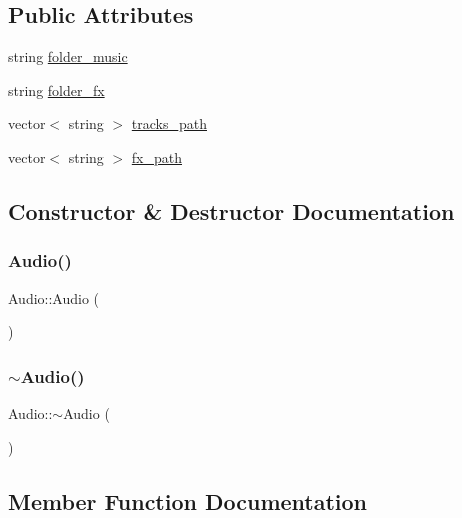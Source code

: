\subsection*{Public Attributes}
\begin{DoxyCompactItemize}
\item 
string \mbox{\hyperlink{class_audio_aeee37053acc6e828584929773ecc06db}{folder\+\_\+music}}
\item 
string \mbox{\hyperlink{class_audio_a2f33c4f728cb34b9d9225f24b7e12fed}{folder\+\_\+fx}}
\item 
vector$<$ string $>$ \mbox{\hyperlink{class_audio_ab3d160f5e442a0792424d4a506356a25}{tracks\+\_\+path}}
\item 
vector$<$ string $>$ \mbox{\hyperlink{class_audio_a159ec23ed30c61829850d4917bfb5ce7}{fx\+\_\+path}}
\end{DoxyCompactItemize}


\subsection{Constructor \& Destructor Documentation}
\mbox{\label{class_audio_aa9d3935a2b91ab4b825bc0cb05f245ea}} 
\subsubsection{\texorpdfstring{Audio()}{Audio()}}
{\footnotesize\ttfamily Audio\+::\+Audio (\begin{DoxyParamCaption}{ }\end{DoxyParamCaption})}

\mbox{\label{class_audio_ae8f54deecb5f48511aaab469e80294d6}} 
\subsubsection{\texorpdfstring{$\sim$Audio()}{~Audio()}}
{\footnotesize\ttfamily Audio\+::$\sim$\+Audio (\begin{DoxyParamCaption}{ }\end{DoxyParamCaption})\hspace{0.3cm}{\ttfamily [virtual]}}



\subsection{Member Function Documentation}
\mbox{\label{class_audio_a8bcf0de9b914141f53e10e920d8f6d72}} 
